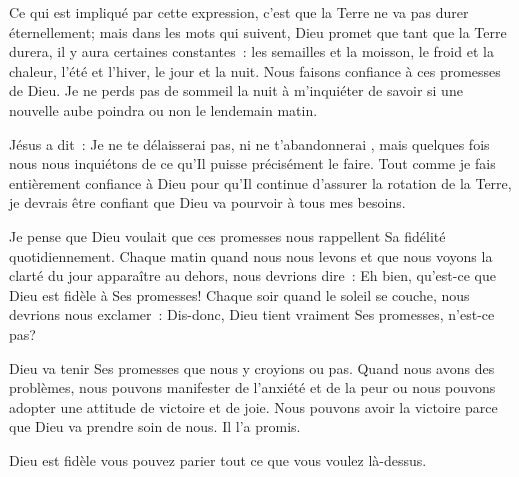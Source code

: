 
 Ce qui est
 impliqué par cette expression, c'est que la Terre ne va pas durer éternellement;
 mais dans les mots qui suivent, Dieu promet que tant que la Terre durera, il y
 aura certaines constantes~: les semailles et la moisson, le froid et la chaleur,
 l'été et l'hiver, le jour et la nuit. Nous faisons confiance à ces promesses de
 Dieu. Je ne perds pas de sommeil la nuit à m'inquiéter de savoir si une nouvelle
 aube poindra ou non le lendemain matin. 


Jésus a dit~: 
 \og Je ne te délaisserai pas, ni ne t'abandonnerai \fg{}, mais
 quelques fois nous nous inquiétons de ce qu'Il puisse précisément le faire.
 Tout comme je fais entièrement confiance à Dieu pour qu'Il continue d'assurer
 la rotation de la Terre, je devrais être confiant que Dieu va pourvoir à tous
 mes besoins.

Je pense que Dieu voulait que ces promesses nous rappellent Sa fidélité
 quotidiennement. Chaque matin quand nous nous levons et que nous voyons la
 clarté du jour apparaître au dehors, nous devrions dire~: \og Eh bien, qu'est-ce
 que Dieu est fidèle à Ses promesses! \fg{} Chaque soir quand le soleil se
 couche, nous devrions nous exclamer~: \og Dis-donc, Dieu tient vraiment Ses
 promesses, n'est-ce pas? \fg{}

Dieu va tenir Ses promesses que nous y croyions ou pas. Quand nous avons des
 problèmes, nous pouvons manifester de l'anxiété et de la peur ou nous pouvons
 adopter une attitude de victoire et de joie. Nous pouvons avoir la victoire
 parce que Dieu va prendre soin de nous. Il l'a promis.

Dieu est fidèle \ocadr{}vous pouvez parier tout ce que vous voulez là-dessus. 

\dvrule




